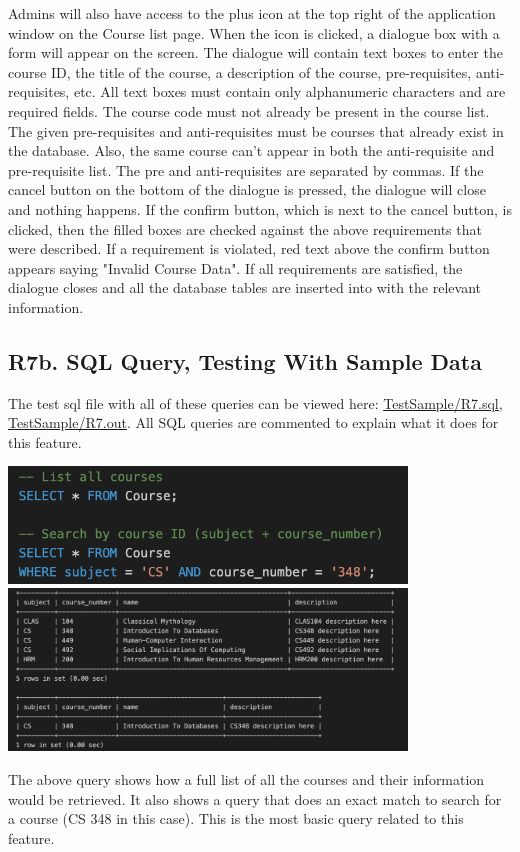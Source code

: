 \documentclass[12pt, a4paper]{article}
\begin{document}
Admins will also have access to the plus icon at the top right of the application window on the Course list page. When the icon is clicked, a dialogue box with a form will appear on the screen. The dialogue will contain text boxes to enter the course ID, the title of the course, a description of the course, pre-requisites, anti-requisites, etc. All text boxes must contain only alphanumeric characters and are required fields. The course code must not already be present in the course list. The given pre-requisites and anti-requisites must be courses that already exist in the database. Also, the same course can't appear in both the anti-requisite and pre-requisite list. The pre and anti-requisites are separated by commas. If the cancel button on the bottom of the dialogue is pressed, the dialogue will close and nothing happens. If the confirm button, which is next to the cancel button, is clicked, then the filled boxes are checked against the above requirements that were described. If a requirement is violated, red text above the confirm button appears saying "Invalid Course Data". If all requirements are satisfied, the dialogue closes and all the database tables are inserted into with the relevant information.

\subsection*{R7b. SQL Query, Testing With Sample Data}
The test sql file with all of these queries can be viewed here: \underline{\href{https://github.com/Kggupta/DegreeMap/tree/main/Database/Queries/TestSample}{TestSample/R7.sql}}, \underline{\href{https://github.com/Kggupta/DegreeMap/tree/main/Database/Queries/TestSample}{TestSample/R7.out}}. All SQL queries are commented to explain what it does for this feature.

\begin{center}
    \includegraphics[width=400px]{R7/q1}
    \includegraphics[width=400px]{R7/q1out}
\end{center}
The above query shows how a full list of all the courses and their information would be retrieved. It also shows a query that does an exact match to search for a course (CS 348 in this case). This is the most basic query related to this feature.
\end{document}
